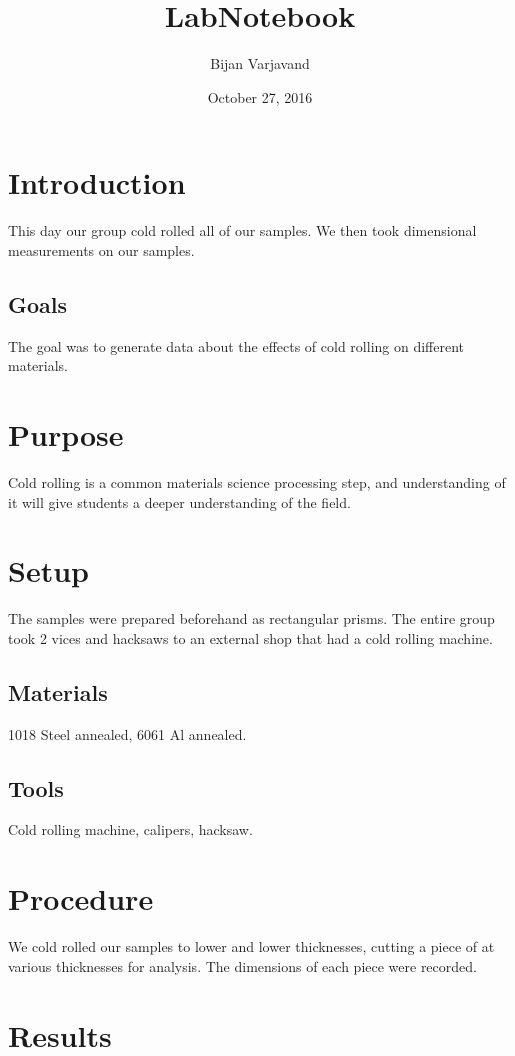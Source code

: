 \documentclass{article}
\author{Bijan Varjavand}
\title{LabNotebook}
\date{October 27, 2016}
\begin{document}
\maketitle

\section{Introduction}

This day our group cold rolled all of our samples. We then took dimensional measurements on our samples.
\subsection{Goals}

The goal was to generate data about the effects of cold rolling on different materials.
\section{Purpose}

Cold rolling is a common materials science processing step, and understanding of it will give students a deeper understanding of the field.
\section{Setup}

The samples were prepared beforehand as rectangular prisms. The entire group took 2 vices and hacksaws to an external shop that had a cold rolling machine.
\subsection{Materials}

1018 Steel annealed, 6061 Al annealed.
\subsection{Tools}

Cold rolling machine, calipers, hacksaw.
\section{Procedure}

We cold rolled our samples to lower and lower thicknesses, cutting a piece of at various thicknesses for analysis. The dimensions of each piece were recorded.
\section{Results}
\end{document}
